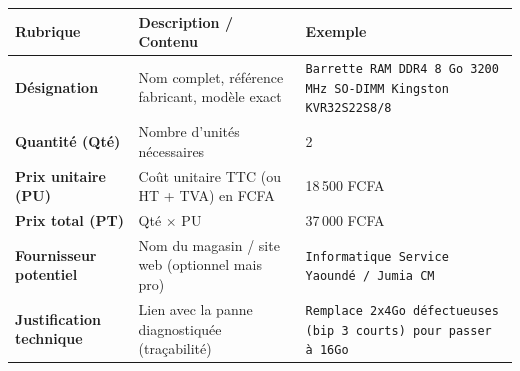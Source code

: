 \documentclass[11pt]{article}
\begin{document}
\begin{aretenir}
\begin{center}
\begin{tabularx}{\linewidth}{|l|X|X|}\hline
\rowcolor{popblueL}
\textbf{Rubrique} & \textbf{Description / Contenu} & \textbf{Exemple} \\\hline
\textbf{Désignation} & Nom complet, référence fabricant, modèle exact & \texttt{Barrette RAM DDR4 8 Go 3200 MHz SO-DIMM Kingston KVR32S22S8/8} \\\hline
\textbf{Quantité (Qté)} & Nombre d'unités nécessaires & 2 \\\hline
\textbf{Prix unitaire (PU)} & Coût unitaire TTC (ou HT + TVA) en FCFA & 18\,500 FCFA \\\hline
\textbf{Prix total (PT)} & Qté $\times$ PU & 37\,000 FCFA \\\hline
\textbf{Fournisseur potentiel} & Nom du magasin / site web (optionnel mais pro) & \texttt{Informatique Service Yaoundé / Jumia CM} \\\hline
\textbf{Justification technique} & Lien avec la panne diagnostiquée (traçabilité) & \texttt{Remplace 2x4Go défectueuses (bip 3 courts) pour passer à 16Go} \\\hline
\end{tabularx}
\end{center}
\end{aretenir}
\end{document}
